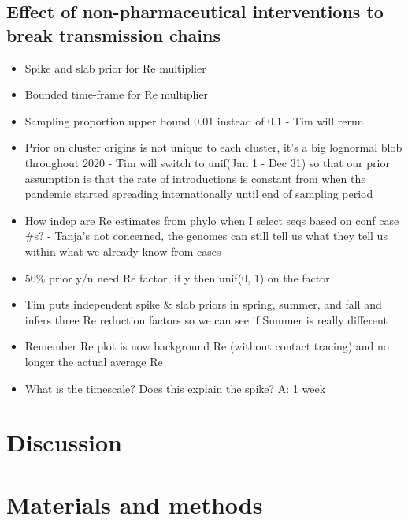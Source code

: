 \documentclass[9pt,twocolumn,twoside,lineno]{pnas-new}
\begin{document}
\subsection{Effect of non-pharmaceutical interventions to break transmission chains}

\begin{itemize}
    \item Spike and slab prior for Re multiplier
    \item Bounded time-frame for Re multiplier
    \item Sampling proportion upper bound 0.01 instead of 0.1 - Tim will rerun
    \item Prior on cluster origins is not unique to each cluster, it's a big lognormal blob throughout 2020 - Tim will switch to unif(Jan 1 - Dec 31) so that our prior assumption is that the rate of introductions is constant from when the pandemic started spreading internationally until end of sampling period
    \item How indep are Re estimates from phylo when I select seqs based on conf case \#s? - Tanja's not concerned, the genomes can still tell us what they tell us within what we already know from cases
    \item 50\% prior y/n need Re factor, if y then unif(0, 1) on the factor 
    \item Tim puts independent spike & slab priors in spring, summer, and fall and infers three Re reduction factors so we can see if Summer is really different
    \item Remember Re plot is now background Re (without contact tracing) and no longer the actual average Re
    \item What is the timescale? Does this explain the spike? A: 1 week
\end{itemize}

\section{Discussion}

\section{Materials and methods}
\end{document}
